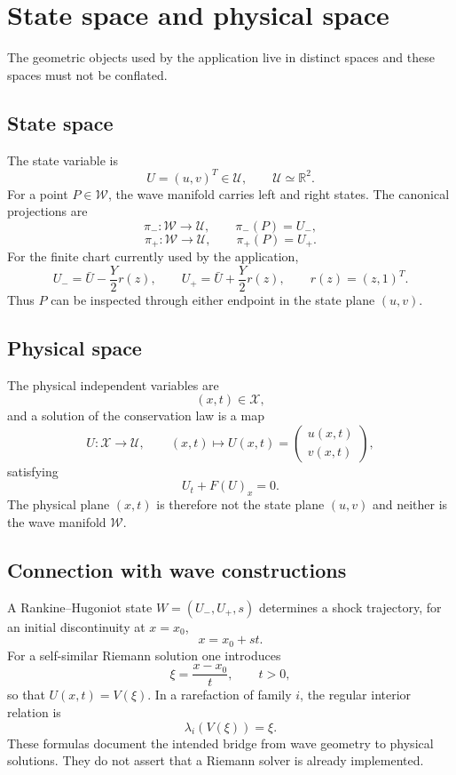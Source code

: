 \section{State space and physical space}

The geometric objects used by the application live in distinct spaces and these spaces must not be conflated.

\subsection{State space}
The state variable is
\[
U=(u,v)^T\in\mathcal U,\qquad \mathcal U\simeq\mathbb R^2.
\]
For a point $P\in\mathcal W$, the wave manifold carries left and right states.  The canonical projections are
\[
\pi_-:\mathcal W\to\mathcal U,\qquad \pi_-(P)=U_-,
\]
\[
\pi_+:\mathcal W\to\mathcal U,\qquad \pi_+(P)=U_+.
\]
For the finite chart currently used by the application,
\[
U_-=\bar U-\frac{Y}{2}r(z),\qquad
U_+=\bar U+\frac{Y}{2}r(z),\qquad r(z)=(z,1)^T.
\]
Thus $P$ can be inspected through either endpoint in the state plane $(u,v)$.

\subsection{Physical space}
The physical independent variables are
\[
(x,t)\in\mathcal X,
\]
and a solution of the conservation law is a map
\[
U:\mathcal X\longrightarrow\mathcal U,\qquad
(x,t)\longmapsto U(x,t)=\begin{pmatrix}u(x,t)\\v(x,t)\end{pmatrix},
\]
satisfying
\[
U_t+F(U)_x=0.
\]
The physical plane $(x,t)$ is therefore not the state plane $(u,v)$ and neither is the wave manifold $\mathcal W$.

\subsection{Connection with wave constructions}
A Rankine--Hugoniot state $W=(U_-,U_+,s)$ determines a shock trajectory, for an initial discontinuity at $x=x_0$,
\[
x=x_0+st.
\]
For a self-similar Riemann solution one introduces
\[
\xi=\frac{x-x_0}{t},\qquad t>0,
\]
so that $U(x,t)=V(\xi)$.  In a rarefaction of family $i$, the regular interior relation is
\[
\lambda_i(V(\xi))=\xi.
\]
These formulas document the intended bridge from wave geometry to physical solutions.  They do not assert that a Riemann solver is already implemented.


